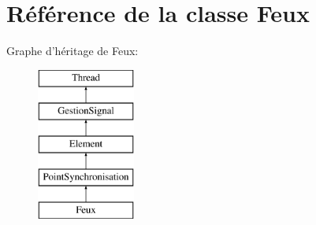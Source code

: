 \hypertarget{classFeux}{
\section{Référence de la classe Feux}
\label{classFeux}
}
Graphe d'héritage de Feux:\begin{figure}[H]
\begin{center}
\leavevmode
\includegraphics[height=5cm]{classFeux}
\end{center}
\end{figure}
